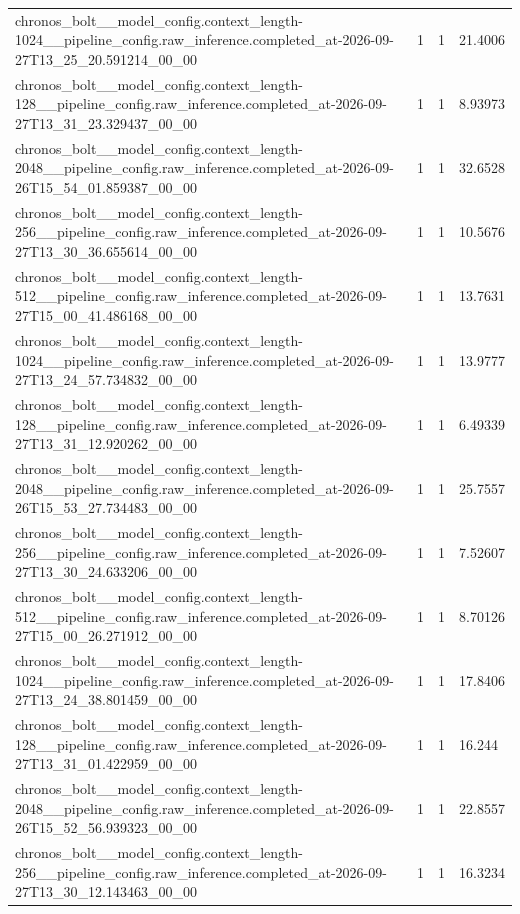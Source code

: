 \begin{tabular}{llll}
chronos\_bolt\_\_model\_config.context\_length-1024\_\_pipeline\_config.raw\_inference.completed\_at-2026-09-27T13\_25\_20.591214\_00\_00 & 1 & 1 & 21.4006 \\
chronos\_bolt\_\_model\_config.context\_length-128\_\_pipeline\_config.raw\_inference.completed\_at-2026-09-27T13\_31\_23.329437\_00\_00 & 1 & 1 & 8.93973 \\
chronos\_bolt\_\_model\_config.context\_length-2048\_\_pipeline\_config.raw\_inference.completed\_at-2026-09-26T15\_54\_01.859387\_00\_00 & 1 & 1 & 32.6528 \\
chronos\_bolt\_\_model\_config.context\_length-256\_\_pipeline\_config.raw\_inference.completed\_at-2026-09-27T13\_30\_36.655614\_00\_00 & 1 & 1 & 10.5676 \\
chronos\_bolt\_\_model\_config.context\_length-512\_\_pipeline\_config.raw\_inference.completed\_at-2026-09-27T15\_00\_41.486168\_00\_00 & 1 & 1 & 13.7631 \\
chronos\_bolt\_\_model\_config.context\_length-1024\_\_pipeline\_config.raw\_inference.completed\_at-2026-09-27T13\_24\_57.734832\_00\_00 & 1 & 1 & 13.9777 \\
chronos\_bolt\_\_model\_config.context\_length-128\_\_pipeline\_config.raw\_inference.completed\_at-2026-09-27T13\_31\_12.920262\_00\_00 & 1 & 1 & 6.49339 \\
chronos\_bolt\_\_model\_config.context\_length-2048\_\_pipeline\_config.raw\_inference.completed\_at-2026-09-26T15\_53\_27.734483\_00\_00 & 1 & 1 & 25.7557 \\
chronos\_bolt\_\_model\_config.context\_length-256\_\_pipeline\_config.raw\_inference.completed\_at-2026-09-27T13\_30\_24.633206\_00\_00 & 1 & 1 & 7.52607 \\
chronos\_bolt\_\_model\_config.context\_length-512\_\_pipeline\_config.raw\_inference.completed\_at-2026-09-27T15\_00\_26.271912\_00\_00 & 1 & 1 & 8.70126 \\
chronos\_bolt\_\_model\_config.context\_length-1024\_\_pipeline\_config.raw\_inference.completed\_at-2026-09-27T13\_24\_38.801459\_00\_00 & 1 & 1 & 17.8406 \\
chronos\_bolt\_\_model\_config.context\_length-128\_\_pipeline\_config.raw\_inference.completed\_at-2026-09-27T13\_31\_01.422959\_00\_00 & 1 & 1 & 16.244 \\
chronos\_bolt\_\_model\_config.context\_length-2048\_\_pipeline\_config.raw\_inference.completed\_at-2026-09-26T15\_52\_56.939323\_00\_00 & 1 & 1 & 22.8557 \\
chronos\_bolt\_\_model\_config.context\_length-256\_\_pipeline\_config.raw\_inference.completed\_at-2026-09-27T13\_30\_12.143463\_00\_00 & 1 & 1 & 16.3234 \\

\end{tabular}
